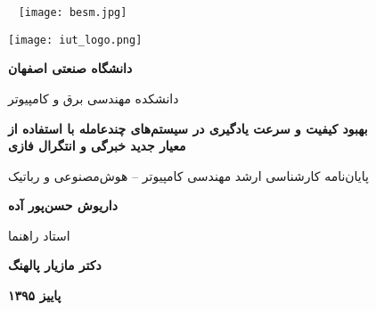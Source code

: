 

\thispagestyle{empty}
\mbox{}
\pagebreak

\thispagestyle{empty}
\begin{center}
	~\vfill
	\texttt{[image: besm.jpg]}
	~\vfill
\end{center}
\pagebreak

\thispagestyle{empty}
\begin{center}
\texttt{[image: iut\_logo.png]}
\vspace{0.4cm}

\textbf{دانشگاه صنعتی اصفهان}\\
\vspace{0.4cm}

{\large

	دانشکده مهندسی برق و کامپیوتر
}
\vspace{3.5cm}

{\Large
	\textbf{بهبود کیفیت و سرعت یادگیری در سیستم‌های چندعامله با استفاده از
	\\
	معیار جدید خبرگی و انتگرال فازی}\\
}
\vspace{2.5cm}

{\Large
	پایان‌نامه کارشناسی ارشد مهندسی کامپیوتر -- هوش‌مصنوعی و رباتیک\\
}
\vspace{1cm}

{\large
	\textbf{داریوش حسن‌پور آده}\\
}
\vspace{2.5cm}

{\large
	استاد راهنما\\
}
\vspace{0.5cm}

{\large
	\textbf{دکتر مازیار پالهنگ}\\
}
\vfill

\textbf{پاییز ۱۳۹۵}

\end{center}
\restoregeometry
\pagebreak

